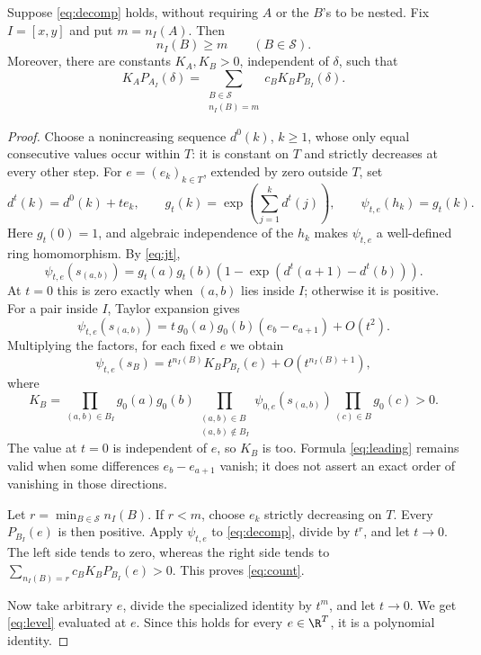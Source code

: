 \documentclass[11pt]{amsart}
\begin{document}
\begin{lemma}\label{lem:interval}
Suppose \eqref{eq:decomp} holds, without requiring $A$ or the $B$'s
to be nested. Fix $I=[x,y]$ and put $m=n_I(A)$. Then
\begin{equation}\label{eq:count}
 n_I(B)\ge m\qquad(B\in\mathcal S).
\end{equation}
Moreover, there are constants $K_A,K_B>0$, independent of $\delta$,
such that
\begin{equation}\label{eq:level}
 K_AP_{A_I}(\delta)=
 \sum_{\substack{B\in\mathcal S\\n_I(B)=m}}
 c_BK_BP_{B_I}(\delta).
\end{equation}
\end{lemma}

\begin{proof}
Choose a nonincreasing sequence $d^0(k)$, $k\ge1$, whose only equal
consecutive values occur within $T$: it is constant on $T$ and strictly
decreases at every other step. For $e=(e_k)_{k\in T}$, extended by zero
outside $T$, set
\[
 d^t(k)=d^0(k)+te_k,
 \qquad g_t(k)=\exp\left(\sum_{j=1}^k d^t(j)\right),
 \qquad \psi_{t,e}(h_k)=g_t(k).
\]
Here $g_t(0)=1$, and algebraic independence of the $h_k$ makes
$\psi_{t,e}$ a well-defined ring homomorphism. By \eqref{eq:jt},
\begin{equation}\label{eq:factor}
 \psi_{t,e}(s_{(a,b)})
 =g_t(a)g_t(b)\left(1-\exp(d^t(a+1)-d^t(b))\right).
\end{equation}
At $t=0$ this is zero exactly when $(a,b)$ lies inside $I$; otherwise
it is positive. For a pair inside $I$, Taylor expansion gives
\[
 \psi_{t,e}(s_{(a,b)})
 =t\,g_0(a)g_0(b)(e_b-e_{a+1})+O(t^2).
\]
Multiplying the factors, for each fixed $e$ we obtain
\begin{equation}\label{eq:leading}
 \psi_{t,e}(s_B)
 =t^{n_I(B)}K_BP_{B_I}(e)+O(t^{n_I(B)+1}),
\end{equation}
where
\[
 K_B=
 \prod_{(a,b)\in B_I}g_0(a)g_0(b)
 \prod_{\substack{(a,b)\in B\\(a,b)\notin B_I}}
       \psi_{0,e}(s_{(a,b)})
 \prod_{(c)\in B}g_0(c)>0.
\]
The value at $t=0$ is independent of $e$, so $K_B$ is too. Formula
\eqref{eq:leading} remains valid when some differences $e_b-e_{a+1}$
vanish; it does not assert an exact order of vanishing in those directions.

Let $r=\min_{B\in\mathcal S}n_I(B)$. If $r<m$, choose $e_k$
strictly decreasing on $T$. Every $P_{B_I}(e)$ is then positive.
Apply $\psi_{t,e}$ to \eqref{eq:decomp}, divide by $t^r$, and let
$t\to0$. The left side tends to zero, whereas the right side tends to
$\sum_{n_I(B)=r}c_BK_BP_{B_I}(e)>0$. This proves \eqref{eq:count}.

Now take arbitrary $e$, divide the specialized identity by $t^m$,
and let $t\to0$. We get \eqref{eq:level} evaluated at $e$.
Since this holds for every $e\in\R^T$, it is a polynomial identity.
\end{proof}
\end{document}
